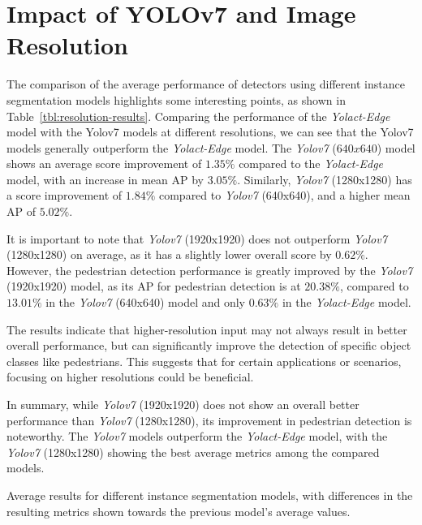 
\section{Impact of YOLOv7 and Image Resolution}
\label{sec:impactyolov7}

The comparison of the average performance of detectors using different instance segmentation models highlights some interesting points, as shown in Table~\ref{tbl:resolution-results}.
Comparing the performance of the \textit{Yolact-Edge} model with the Yolov7 models at different resolutions, we can see that the Yolov7 models generally outperform the \textit{Yolact-Edge} model.
The \textit{Yolov7} ($640x640$) model shows an average score improvement of $1.35\%$ compared to the \textit{Yolact-Edge} model, with an increase in mean AP by $3.05\%$.
Similarly, \textit{Yolov7} (1280x1280) has a score improvement of $1.84\%$ compared to \textit{Yolov7} (640x640), and a higher mean AP of $5.02\%$.

It is important to note that \textit{Yolov7} (1920x1920) does not outperform \textit{Yolov7} (1280x1280) on average, as it has a slightly lower overall score by $0.62\%$.
However, the pedestrian detection performance is greatly improved by the \textit{Yolov7} (1920x1920) model, as its AP for pedestrian detection is at $20.38\%$, compared to $13.01\%$ in the \textit{Yolov7} (640x640) model and only $0.63\%$ in the \textit{Yolact-Edge} model.

The results indicate that higher-resolution input may not always result in better overall performance, but can significantly improve the detection of specific object classes like pedestrians.
This suggests that for certain applications or scenarios, focusing on higher resolutions could be beneficial.

In summary, while \textit{Yolov7} (1920x1920) does not show an overall better performance than \textit{Yolov7} (1280x1280), its improvement in pedestrian detection is noteworthy.
The \textit{Yolov7} models outperform the \textit{Yolact-Edge} model, with the \textit{Yolov7} (1280x1280) showing the best average metrics among the compared models.

\begin{table}[htbp]
    
    \caption{Average results for different instance segmentation models, with differences in the resulting metrics shown towards the previous model's average values.}
    \label{tbl:resolution-results}
\end{table}

